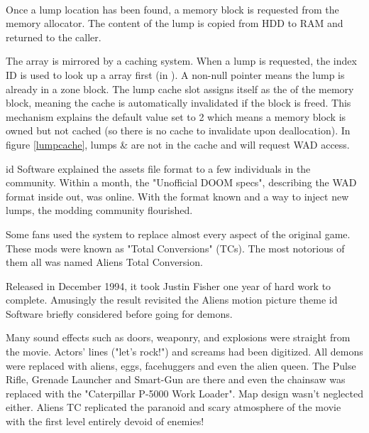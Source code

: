 \par
{}\\
\par
Once a lump location has been found, a memory block is requested from the memory allocator. The content of the lump is copied from HDD to RAM and returned to the caller. \\
\par
The  array is mirrored by a  caching system. When a lump is requested, the index ID is used to look up a  array first (in ). A non-null pointer means the lump is already in a zone block. The lump cache slot assigns itself as the  of the memory block, meaning the cache is automatically invalidated if the block is freed. This mechanism explains the default  value set to 2 which means a memory block is owned but not cached (so there is no cache to invalidate upon deallocation). In figure \ref{lumpcache}, lumps  \&  are not in the cache and will request WAD access.\\
\par
{}
\par
{}


id Software explained the assets file format to a few individuals in the community. Within a month, the "Unofficial DOOM specs", describing the WAD format inside out, was online. With the format known and a way to inject new lumps, the modding community flourished.\\
\par

Some fans used the system to replace almost every aspect of the original game. These mods were known as "Total Conversions" (TCs). The most notorious of them all was named Aliens Total Conversion.\\
\par
Released in December 1994, it took Justin Fisher one year of hard work to complete. Amusingly the result revisited the Aliens motion picture theme id Software briefly considered before going for demons.\\
\par
 \par
 \vspace{10pt}
 Many sound effects such as doors, weaponry, and explosions were straight from the movie. Actors' lines ("let's rock!") and screams had been digitized. All demons were replaced with aliens, eggs, facehuggers and even the alien queen. The Pulse Rifle, Grenade Launcher and Smart-Gun are there and even the chainsaw was replaced with the "Caterpillar P-5000 Work Loader". Map design wasn't neglected either. Aliens TC replicated the paranoid and scary atmosphere of the movie with the first level entirely devoid of enemies!
